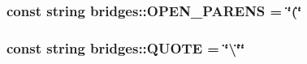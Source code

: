 \subsubsection[{O\+P\+E\+N\+\_\+\+P\+A\+R\+E\+N\+S}]{\setlength{\rightskip}{0pt plus 5cm}const string bridges\+::\+O\+P\+E\+N\+\_\+\+P\+A\+R\+E\+N\+S = \char`\"{}(\char`\"{}}\label{namespacebridges_ad909fb43b05ef6b7271fddbe85e2742a}
\hypertarget{namespacebridges_acd8357e88562cbb7e60bea3fac422ac3}{}
\subsubsection[{Q\+U\+O\+T\+E}]{\setlength{\rightskip}{0pt plus 5cm}const string bridges\+::\+Q\+U\+O\+T\+E = \char`\"{}\textbackslash{}\char`\"{}\char`\"{}}\label{namespacebridges_acd8357e88562cbb7e60bea3fac422ac3}
